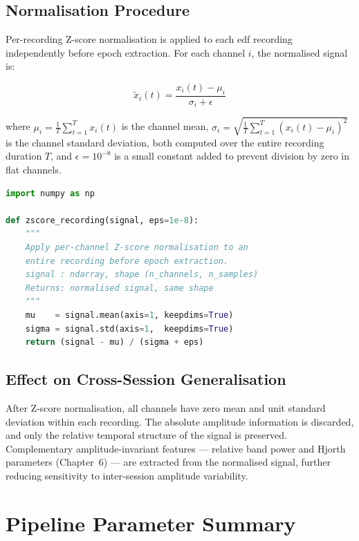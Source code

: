 \subsection{Normalisation Procedure}

Per-recording Z-score normalisation is applied to each
\acrshort{edf} recording independently before epoch extraction.
For each channel $i$, the normalised signal is:

\begin{equation}
\tilde{x}_i(t) = \frac{x_i(t) - \mu_i}{\sigma_i + \epsilon}
\label{eq:zscore}
\end{equation}

\noindent where $\mu_i = \frac{1}{T}\sum_{t=1}^{T} x_i(t)$
is the channel mean, $\sigma_i = \sqrt{\frac{1}{T}
\sum_{t=1}^{T}(x_i(t) - \mu_i)^2}$ is the channel standard
deviation, both computed over the entire recording duration $T$,
and $\epsilon = 10^{-8}$ is a small constant added to prevent
division by zero in flat channels.

\begin{lstlisting}[language=Python,
    caption={Per-recording Z-score normalisation.},
    label={lst:zscore}]
import numpy as np

def zscore_recording(signal, eps=1e-8):
    """
    Apply per-channel Z-score normalisation to an
    entire recording before epoch extraction.
    signal : ndarray, shape (n_channels, n_samples)
    Returns: normalised signal, same shape
    """
    mu    = signal.mean(axis=1, keepdims=True)
    sigma = signal.std(axis=1,  keepdims=True)
    return (signal - mu) / (sigma + eps)
\end{lstlisting}

\subsection{Effect on Cross-Session Generalisation}

After Z-score normalisation, all channels have zero mean and
unit standard deviation within each recording. The absolute
amplitude information is discarded, and only the relative
temporal structure of the signal is preserved. Complementary
amplitude-invariant features — relative band power and Hjorth
parameters (Chapter~6) — are extracted from the normalised
signal, further reducing sensitivity to inter-session
amplitude variability.

\section{Pipeline Parameter Summary}
\label{sec:sp_params}

